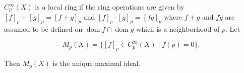 $C_p^\infty(X)$ is a local ring if the ring operations are given by $[f]_p + [g]_p = [f + g]_p$ and $[f]_p \cdot [g]_p = [fg]_p$ where $f + g$ and $fg$ are assumed to be defined on $\operatorname{dom} f \cap \operatorname{dom} g$ which is a neighborhood of $p$. Let

$$M_p(X) = \{[f]_p \in C_p^\infty(X) \mid f(p) = 0\}.$$

Then $M_p(X)$ is the unique maximal ideal.
